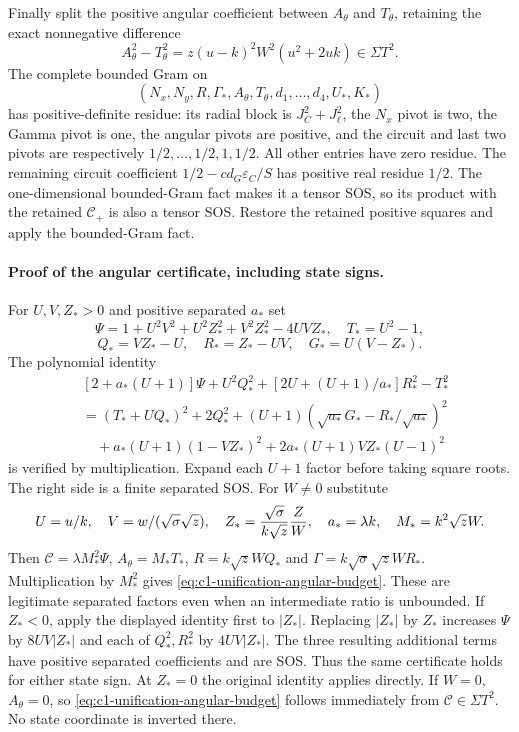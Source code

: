 \documentclass[10pt,a4paper]{article}
\begin{document}
Finally split the positive angular coefficient between $A_\theta$
and $T_\theta$, retaining the exact nonnegative difference
\[
 A_\theta^2-T_\theta^2=z(u-k)^2W^2(u^2+2uk)\in\Sigma T^2.
\]
The complete bounded Gram on
\[
 (N_x,N_y,R,\Gamma_*,A_\theta,T_\theta,d_1,\ldots,d_4,U_*,K_*)
\]
has positive-definite residue: its radial block is $J_C^2+J_\ell^2$,
the $N_x$ pivot is two, the Gamma pivot is one, the angular pivots
are positive, and the circuit and last two pivots are respectively
$1/2,\ldots,1/2,1,1/2$. All other entries have zero residue.
The remaining circuit coefficient
$1/2-cd_G\varepsilon_C/S$ has positive real residue $1/2$.
The one-dimensional bounded-Gram fact makes it a tensor SOS,
so its product with the retained $\mathscr C_+$ is also a tensor SOS.
Restore the retained positive squares and apply the bounded-Gram fact.

\paragraph{Proof of the angular certificate, including state signs.}
For $U,V,Z_*>0$ and positive separated $a_*$ set
\[
 \Psi=1+U^2V^2+U^2Z_*^2+V^2Z_*^2-4UVZ_*,\quad T_*=U^2-1,
\]
\[
 Q_*=VZ_*-U,\quad R_*=Z_*-UV,\quad G_*=U(V-Z_*).
\]
The polynomial identity
\begin{align*}
 &[2+a_*(U+1)]\Psi+U^2Q_*^2
       +[2U+(U+1)/a_*]R_*^2-T_*^2\\
 &=(T_*+UQ_*)^2+2Q_*^2
 +(U+1)(\sqrt{a_*}G_*-R_*/\sqrt{a_*})^2\\
 &\quad+a_*(U+1)(1-VZ_*)^2
       +2a_*(U+1)VZ_*(U-1)^2
\end{align*}
is verified by multiplication. Expand each $U+1$ factor before
taking square roots. The right side is a finite separated SOS.
For $W\ne0$ substitute
\[
 U=u/k,\quad V=w/(\sqrt\sigma\sqrt z),\quad
 Z_*={\sqrt\sigma\over k\sqrt z}{Z\over W},\quad
 a_*=\lambda k,\quad M_*=k^2\sqrt zW.
\]
Then $\mathscr C=\lambda M_*^2\Psi$,
$A_\theta=M_*T_*$, $R=k\sqrt zWQ_*$ and
$\Gamma=k\sqrt\sigma\sqrt zWR_*$. Multiplication by $M_*^2$
gives \eqref{eq:c1-unification-angular-budget}. These are legitimate
separated factors even when an intermediate ratio is unbounded.
If $Z_*<0$, apply the displayed identity first to $|Z_*|$.
Replacing $|Z_*|$ by $Z_*$ increases $\Psi$ by $8UV|Z_*|$ and
each of $Q_*^2,R_*^2$ by $4UV|Z_*|$. The three resulting additional
terms have positive separated coefficients and are SOS. Thus the
same certificate holds for either state sign. At $Z_*=0$ the original
identity applies directly. If $W=0$, $A_\theta=0$, so
\eqref{eq:c1-unification-angular-budget} follows immediately from
$\mathscr C\in\Sigma T^2$. No state coordinate is inverted there.
\end{document}
